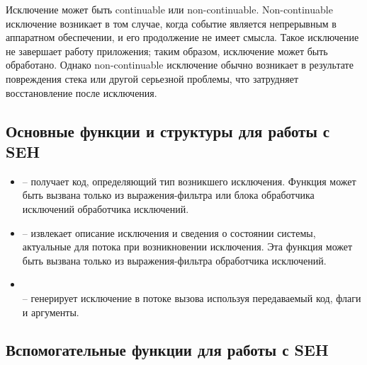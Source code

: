 Исключение может быть continuable или non-continuable. Non-continuable исключение возникает в том случае, когда событие является непрерывным в аппаратном обеспечении, и его продолжение не имеет смысла. Такое исключение не завершает работу приложения; таким образом, исключение может быть обработано. Однако non-continuable исключение обычно возникает в результате повреждения стека или другой серьезной проблемы, что затрудняет восстановление после исключения.

\subsection{Основные функции и структуры для работы с SEH}

\begin{itemize}
	\item {} -- получает код, определяющий тип возникшего исключения. Функция может быть вызвана только из выражения-фильтра или блока обработчика исключений обработчика исключений.
	\item {} -- извлекает описание исключения и сведения о состоянии системы, актуальные для потока при возникновении исключения. Эта функция может быть вызвана только из выражения-фильтра обработчика исключений.
	\item {} \\  -- генерирует исключение в потоке вызова используя передаваемый код, флаги и аргументы.
\end{itemize}


\subsection{Вспомогательные функции для работы с SEH}
\label{sec:utils}

